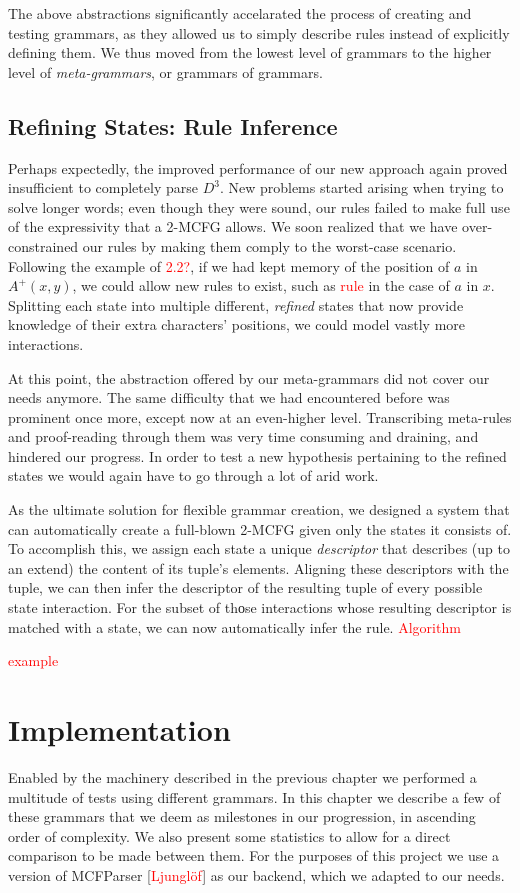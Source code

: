 \documentclass[nonatbib,numbers,10pt]{sigplanconf}
\newcommand\todo[1]{\textcolor{red}{#1}}
\begin{document}
The above abstractions significantly accelarated the process of creating and testing grammars, as they allowed us to simply describe rules instead of explicitly defining them. We thus moved from the lowest level of grammars to the higher level of \textit{meta-grammars}, or grammars of grammars. 

\subsection{Refining States: Rule Inference}
Perhaps expectedly, the improved performance of our new approach again proved insufficient to completely parse $D^3$. New problems started arising when trying to solve longer words; even though they were sound, our rules failed to make full use of the expressivity that a 2-MCFG allows. We soon realized that we have over-constrained our rules by making them comply to the worst-case scenario. Following the example of \todo{2.2?}, if we had kept memory of the position of $a$ in $A^{+}(x,y)$, we could allow new rules to exist, such as \todo{rule} in the case of $a$ in $x$. Splitting each state into multiple different, \textit{refined} states that now provide knowledge of their extra characters' positions, we could model vastly more interactions.

At this point, the abstraction offered by our meta-grammars did not cover our needs anymore. The same difficulty that we had encountered before was prominent once more, except now at an even-higher level. Transcribing meta-rules and proof-reading through them was very time consuming and draining, and hindered our progress. In order to test a new hypothesis pertaining to the refined states we would again have to go through a lot of arid work.

As the ultimate solution for flexible grammar creation, we designed a system that can automatically create a full-blown 2-MCFG given only the states it consists of. To accomplish this, we assign each state a unique \textit{descriptor} that describes (up to an extend) the content of its tuple's elements. Aligning these descriptors with the tuple, we can then infer the descriptor of the resulting tuple of every possible state interaction. For the subset of thοse interactions whose resulting descriptor is matched with a state, we can now automatically infer the rule.
\todo{Algorithm}

\todo{example}

\section{Implementation}
Enabled by the machinery described in the previous chapter we performed a multitude of tests using different grammars. In this chapter we describe a few of these grammars that we deem as milestones in our progression, in ascending order of complexity. We also present some statistics to allow for a direct comparison to be made between them. For the purposes of this project we use a version of MCFParser [\todo{Ljunglöf}] as our backend, which we adapted to our needs.
\end{document}
